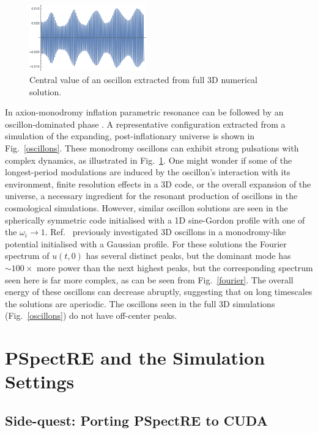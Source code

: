 \documentclass{report}
\begin{document}
\begin{figure}
  \centering
  \includegraphics[width=0.45\textwidth]{plot/3Doscillon.png} 
    \caption{Central value of an oscillon extracted from full 3D numerical solution.}
  \label{raw}
\end{figure}

In  axion-monodromy inflation  \cite{Silverstein:2008sg,McAllister:2008hb,Flauger:2009ab} parametric resonance can be followed by an oscillon-dominated phase  \cite{Amin:2011hj,Zhou:2013tsa}. A  representative configuration  extracted from a simulation of the expanding, post-inflationary universe \cite{Easther:2010qz} is shown in Fig.~\ref{oscillons}. These monodromy oscillons can exhibit strong pulsations with  complex dynamics, as illustrated in Fig.~\ref{raw}.  One might wonder if some of the longest-period modulations are induced by the oscillon's interaction with its environment,  finite resolution effects in a 3D code, or the overall expansion of the universe, a necessary  ingredient for the resonant production of oscillons in the cosmological simulations. However, similar oscillon solutions are seen in the spherically symmetric code initialised with a 1D sine-Gordon profile with one of the $\omega_i\to1$. Ref.~\cite{Salmi:2012ta} previously investigated 3D oscillons in a monodromy-like potential initialised with a Gaussian profile. For these solutions the Fourier spectrum of $u(t,0)$ has several distinct peaks, but the dominant mode has $\sim 100\times$ more power than the next highest peaks, but the corresponding spectrum seen here is far more complex,  as can be seen from  Fig.~\ref{fourier}. The overall energy of these oscillons can decrease abruptly, suggesting that on long timescales the solutions are aperiodic. The oscillons seen in the full 3D simulations (Fig.~\ref{oscillons}) do not have off-center peaks.  

\section{PSpectRE and the Simulation Settings}
\subsection{Side-quest: Porting PSpectRE to CUDA}
\end{document}
